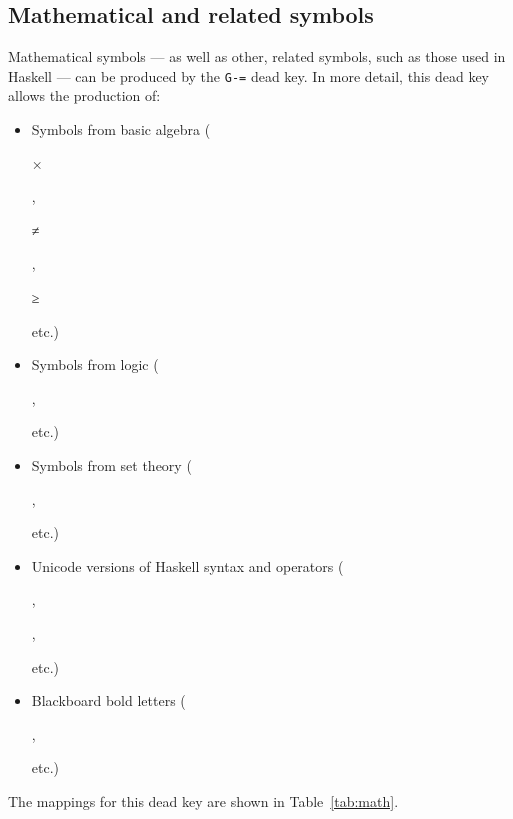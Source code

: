 \documentclass[oneside]{memoir}
\newcommand{\key}{\verb}
\newcommand{\out}[1]{\colorbox{gray!20}{\strut{}#1}}
\begin{document}
\subsection{Mathematical and related symbols}
\label{sec:mathematical_and_related_symbols}

Mathematical symbols --- as well as other, related symbols, such as those used in Haskell --- can be produced by the \key|G-=| dead key.
In more detail, this dead key allows the production of:
\begin{itemize}[noitemsep]
\item Symbols from basic algebra (\out{×}, \out{≠}, \out{≥} etc.)
\item Symbols from logic (\out{}, \out{} etc.)
\item Symbols from set theory (\out{}, \out{} etc.)
\item Unicode versions of Haskell syntax and operators (\out{}, \out{}, \out{} etc.)
\item Blackboard bold letters (\out{}, \out{} etc.)
\end{itemize}
The mappings for this dead key are shown in Table~\ref{tab:math}.
\end{document}
